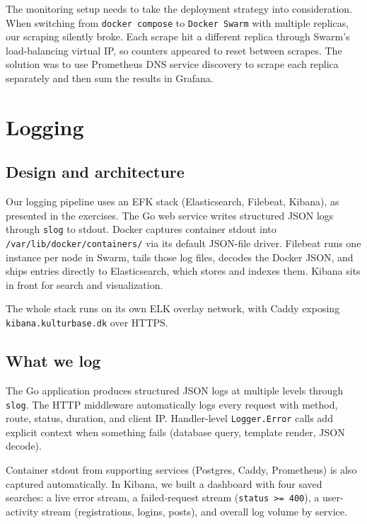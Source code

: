 The monitoring setup needs to take the deployment strategy into consideration. When switching from \texttt{docker compose} to \texttt{Docker Swarm} with multiple replicas, our scraping silently broke. Each scrape hit a different replica through Swarm's load-balancing virtual IP, so counters appeared to reset between scrapes. The solution was to use Prometheus DNS service discovery to scrape each replica separately and then sum the results in Grafana.

\section{Logging}

\subsection{Design and architecture}

Our logging pipeline uses an EFK stack (Elasticsearch, Filebeat, Kibana), as presented in the exercises. The Go web service writes structured JSON logs through \texttt{slog} to stdout. Docker captures container stdout into \texttt{/var/lib/docker/containers/} via its default JSON-file driver. Filebeat runs one instance per node in Swarm, tails those log files, decodes the Docker JSON, and ships entries directly to Elasticsearch, which stores and indexes them. Kibana sits in front for search and visualization.

The whole stack runs on its own ELK overlay network, with Caddy exposing \texttt{kibana.kulturbase.dk} over HTTPS.

\subsection{What we log}

The Go application produces structured JSON logs at multiple levels through \texttt{slog}. The HTTP middleware automatically logs every request with method, route, status, duration, and client IP. Handler-level \texttt{Logger.Error} calls add explicit context when something fails (database query, template render, JSON decode).

Container stdout from supporting services (Postgres, Caddy, Prometheus) is also captured automatically. In Kibana, we built a dashboard with four saved searches: a live error stream, a failed-request stream (\texttt{status >= 400}), a user-activity stream (registrations, logins, posts), and overall log volume by service.

